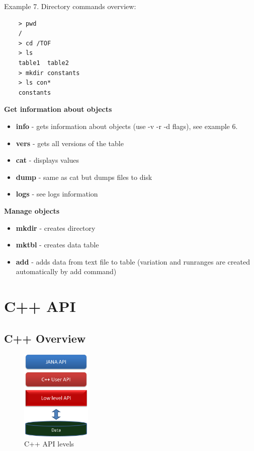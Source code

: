 \documentclass{article}
\begin{document}
Example 7. Directory commands overview:
\begin{verbatim}
    > pwd
    /
	> cd /TOF
	> ls
    table1  table2
	> mkdir constants
	> ls con*
    constants
\end{verbatim}



\textbf{Get information about objects}
\begin{itemize}
  \item \textbf{info} - gets information about objects (use -v -r -d flags), 
  see example 6.
  \item \textbf{vers} - gets all versions of the table
  \item \textbf{cat}  - displays values
  \item \textbf{dump} - same as cat but dumps files to disk
  \item \textbf{logs} - see logs information
\end{itemize}


\textbf{Manage objects}
\begin{itemize}
  \item \textbf{mkdir} - creates directory
  \item \textbf{mktbl} - creates data table
  \item \textbf{add} - adds data from text file to table
        (variation and runranges are created automatically by add command)
\end{itemize}

\newpage
\section{C++ API}\label{sec:cpp}


\subsection{C++ Overview}

\begin{figure}[h]
  \centering
  \includegraphics[width=0.3\textwidth,natwidth=431,natheight=552]{pics/cpp_api_levels.png}
  \caption{C++ API levels}
  \label{pic:cpp_api_levels}
\end{figure}
\end{document}
